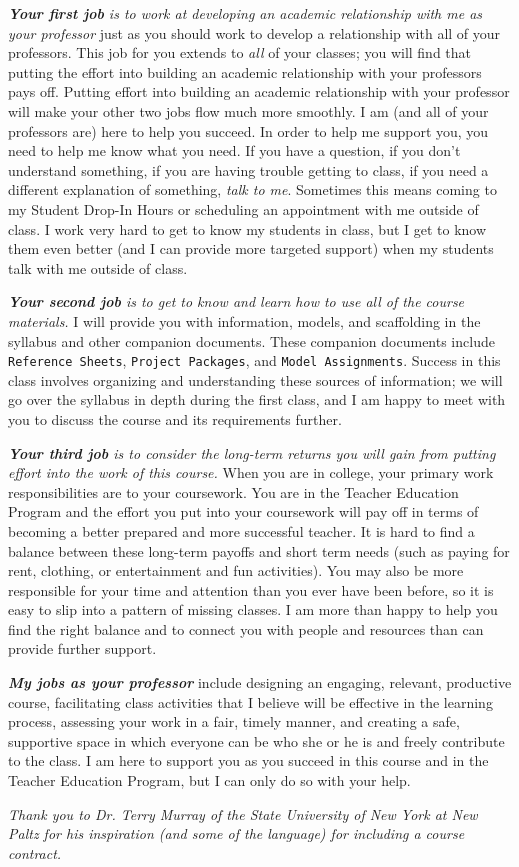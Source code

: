 \textit{\textbf{Your first job} is to work at developing an academic relationship with me as your professor} just as you should work to develop a relationship with all of your professors. This job for you extends to \emph{all} of your classes; you will find that putting the effort into building an academic relationship with your professors pays off. Putting effort into building an academic relationship with your professor will make your other two jobs flow much more smoothly. I am (and all of your professors are) here to help you succeed. In order to help me support you, you need to help me know what you need. If you have a question, if you don't understand something, if you are having trouble getting to class, if you need a different explanation of something, \emph{talk to me}. Sometimes this means coming to my Student Drop-In Hours or scheduling an appointment with me outside of class. I work very hard to get to know my students in class, but I get to know them even better (and I can provide more targeted support) when my students talk with me outside of class.

\textit{\textbf{Your second job} is to get to know and learn how to use all of the course materials.} I will provide you with information, models, and scaffolding in the syllabus and other companion documents. These companion documents include \texttt{Reference Sheets}, \texttt{Project Packages}, and \texttt{Model Assignments}. Success in this class involves organizing and understanding these sources of information; we will go over the syllabus in depth during the first class, and I am happy to meet with you to discuss the course and its requirements further.

\textit{\textbf{Your third job} is to consider the long-term returns you will gain from putting effort into the work of this course.} When you are in college, your primary work responsibilities are to your coursework. You are in the Teacher Education Program and the effort you put into your coursework will pay off in terms of becoming a better prepared and more successful teacher. It is hard to find a balance between these long-term payoffs and short term needs (such as paying for rent, clothing, or entertainment and fun activities). You may also be more responsible for your time and attention than you ever have been before, so it is easy to slip into a pattern of missing classes. I am more than happy to help you find the right balance and to connect you with people and resources than can provide further support.

\textit{\textbf{My jobs as your professor}} include designing an engaging, relevant, productive course, facilitating class activities that I believe will be effective in the learning process, assessing your work in a fair, timely manner, and creating a safe, supportive space in which everyone can be who she or he is and freely contribute to the class. I am here to support you as you succeed in this course and in the Teacher Education Program, but I can only do so with your help.

\bigskip

\small\textit{Thank you to Dr. Terry Murray of the State University of New York at New Paltz for his inspiration (and some of the language) for including a course contract.}\normalsize
